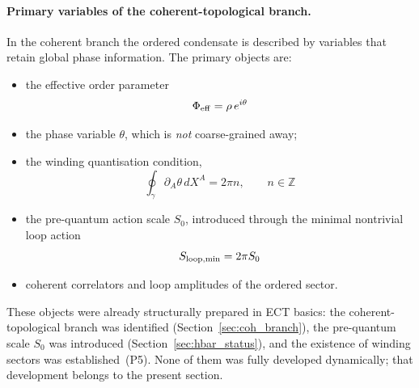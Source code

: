 \paragraph{Primary variables of the coherent-topological branch.}
In the coherent branch the ordered condensate is described by
variables that retain global phase information.
The primary objects are:
\begin{itemize}
  \item the effective order parameter
    \begin{equation}
      \Phi_{\rm eff} = \rho\,e^{i\theta}
      \label{eq:qs_order_parameter}
    \end{equation}
  \item the phase variable $\theta$, which is \emph{not}
    coarse-grained away;
  \item the winding quantisation condition,
    \begin{equation}
      \oint_\gamma \partial_A\theta\,dX^A = 2\pi n,
      \qquad n\in\mathbb{Z}
      \label{eq:qs_winding}
    \end{equation}
  \item the pre-quantum action scale $S_0$, introduced through
    the minimal nontrivial loop action
    \begin{equation}
      S_{\rm loop,min} = 2\pi S_0
      \label{eq:qs_Sloop}
    \end{equation}
  \item coherent correlators and loop amplitudes of the ordered sector.
\end{itemize}
These objects were already structurally prepared in ECT basics:
the coherent-topological branch was identified
(Section~\ref{sec:coh_branch}), the pre-quantum scale $S_0$ was
introduced (Section~\ref{sec:hbar_status}), and the existence
of winding sectors was established~(P5).
None of them was fully developed dynamically; that development
belongs to the present section.


